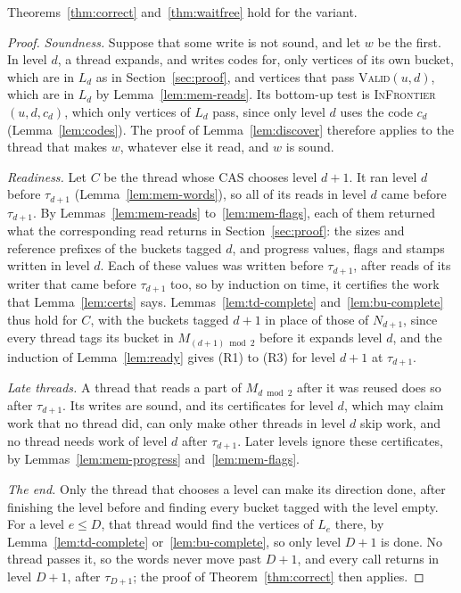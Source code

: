 \begin{theorem}
\label{thm:mem}
Theorems~\ref{thm:correct} and~\ref{thm:waitfree} hold for the variant.
\end{theorem}
\begin{proof}
\emph{Soundness.} Suppose that some write is not sound, and let $w$ be the first. In level $d$, a thread expands, and writes codes for, only vertices of its own bucket, which are in $L_d$ as in Section~\ref{sec:proof}, and vertices that pass \textsc{Valid}$(u, d)$, which are in $L_d$ by Lemma~\ref{lem:mem-reads}. Its bottom-up test is \textsc{InFrontier}$(u, d, c_d)$, which only vertices of $L_d$ pass, since only level $d$ uses the code $c_d$ (Lemma~\ref{lem:codes}). The proof of Lemma~\ref{lem:discover} therefore applies to the thread that makes $w$, whatever else it read, and $w$ is sound.

\emph{Readiness.} Let $C$ be the thread whose CAS chooses level $d+1$. It ran level $d$ before $\tau_{d+1}$ (Lemma~\ref{lem:mem-words}), so all of its reads in level $d$ came before $\tau_{d+1}$. By Lemmas~\ref{lem:mem-reads} to~\ref{lem:mem-flags}, each of them returned what the corresponding read returns in Section~\ref{sec:proof}: the sizes and reference prefixes of the buckets tagged $d$, and progress values, flags and stamps written in level $d$. Each of these values was written before $\tau_{d+1}$, after reads of its writer that came before $\tau_{d+1}$ too, so by induction on time, it certifies the work that Lemma~\ref{lem:certs} says. Lemmas~\ref{lem:td-complete} and~\ref{lem:bu-complete} thus hold for $C$, with the buckets tagged $d+1$ in place of those of $N_{d+1}$, since every thread tags its bucket in $M_{(d+1) \bmod 2}$ before it expands level $d$, and the induction of Lemma~\ref{lem:ready} gives (R1) to (R3) for level $d+1$ at $\tau_{d+1}$.

\emph{Late threads.} A thread that reads a part of $M_{d \bmod 2}$ after it was reused does so after $\tau_{d+1}$. Its writes are sound, and its certificates for level $d$, which may claim work that no thread did, can only make other threads in level $d$ skip work, and no thread needs work of level $d$ after $\tau_{d+1}$. Later levels ignore these certificates, by Lemmas~\ref{lem:mem-progress} and~\ref{lem:mem-flags}.

\emph{The end.} Only the thread that chooses a level can make its direction done, after finishing the level before and finding every bucket tagged with the level empty. For a level $e \leq D$, that thread would find the vertices of $L_e$ there, by Lemma~\ref{lem:td-complete} or~\ref{lem:bu-complete}, so only level $D+1$ is done. No thread passes it, so the words never move past $D+1$, and every call returns in level $D+1$, after $\tau_{D+1}$; the proof of Theorem~\ref{thm:correct} then applies.


\end{proof}

